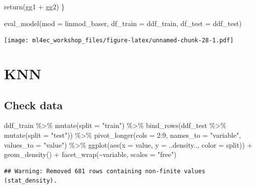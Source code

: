 \documentclass[
]{book}
\newenvironment{Shaded}{\begin{snugshade}}{\end{snugshade}}
\newcommand{\AttributeTok}[1]{\textcolor[rgb]{0.77,0.63,0.00}{#1}}
\newcommand{\DecValTok}[1]{\textcolor[rgb]{0.00,0.00,0.81}{#1}}
\newcommand{\FunctionTok}[1]{\textcolor[rgb]{0.00,0.00,0.00}{#1}}
\newcommand{\NormalTok}[1]{#1}
\newcommand{\SpecialCharTok}[1]{\textcolor[rgb]{0.00,0.00,0.00}{#1}}
\newcommand{\StringTok}[1]{\textcolor[rgb]{0.31,0.60,0.02}{#1}}
\begin{document}
\begin{Shaded}
\begin{Highlighting}[]
  \FunctionTok{return}\NormalTok{(gg1 }\SpecialCharTok{+}\NormalTok{ gg2)}
\NormalTok{\}}

\FunctionTok{eval\_model}\NormalTok{(}\AttributeTok{mod =}\NormalTok{ linmod\_baser, }\AttributeTok{df\_train =}\NormalTok{ ddf\_train, }\AttributeTok{df\_test =}\NormalTok{ ddf\_test)}
\end{Highlighting}
\end{Shaded}

\texttt{[image: ml4ec\_workshop\_files/figure-latex/unnamed-chunk-28-1.pdf]}

\hypertarget{knn}{%
\section{KNN}\label{knn}}

\hypertarget{check-data}{%
\subsection{Check data}\label{check-data}}

\begin{Shaded}
\begin{Highlighting}[]
\NormalTok{ddf\_train }\SpecialCharTok{\%\textgreater{}\%} 
  \FunctionTok{mutate}\NormalTok{(}\AttributeTok{split =} \StringTok{"train"}\NormalTok{) }\SpecialCharTok{\%\textgreater{}\%} 
  \FunctionTok{bind\_rows}\NormalTok{(ddf\_test }\SpecialCharTok{\%\textgreater{}\%} 
    \FunctionTok{mutate}\NormalTok{(}\AttributeTok{split =} \StringTok{"test"}\NormalTok{)) }\SpecialCharTok{\%\textgreater{}\%} 
  \FunctionTok{pivot\_longer}\NormalTok{(}\AttributeTok{cols =} \DecValTok{2}\SpecialCharTok{:}\DecValTok{9}\NormalTok{, }\AttributeTok{names\_to =} \StringTok{"variable"}\NormalTok{, }\AttributeTok{values\_to =} \StringTok{"value"}\NormalTok{) }\SpecialCharTok{\%\textgreater{}\%} 
  \FunctionTok{ggplot}\NormalTok{(}\FunctionTok{aes}\NormalTok{(}\AttributeTok{x =}\NormalTok{ value, }\AttributeTok{y =}\NormalTok{ ..density.., }\AttributeTok{color =}\NormalTok{ split)) }\SpecialCharTok{+}
  \FunctionTok{geom\_density}\NormalTok{() }\SpecialCharTok{+}
  \FunctionTok{facet\_wrap}\NormalTok{(}\SpecialCharTok{\textasciitilde{}}\NormalTok{variable, }\AttributeTok{scales =} \StringTok{"free"}\NormalTok{)}
\end{Highlighting}
\end{Shaded}

\begin{verbatim}
## Warning: Removed 681 rows containing non-finite values (stat_density).
\end{verbatim}
\end{document}
